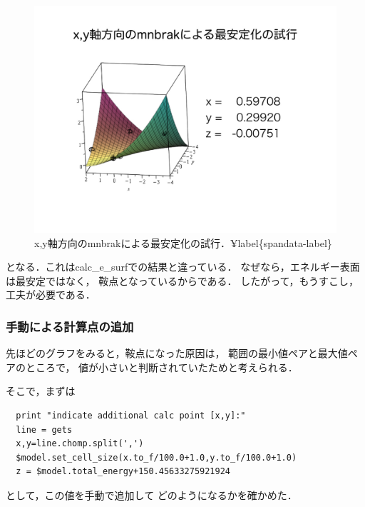 \documentclass[11pt,dvipdfmx]{jsarticle}
\begin{document}
\begin{figure}[H][htbp]
\centering
\begin{center}
\includegraphics[width=150mm]{../.././figs/thesis/thesis_008.jpeg}
\end{center}
\caption{x,y軸方向のmnbrakによる最安定化の試行．¥label\{spandata-label\}}

\label{fig:}
\end{figure}

となる．これはcalc\_e\_surfでの結果と違っている．
なぜなら，エネルギー表面は最安定ではなく， 鞍点となっているからである．
したがって，もうすこし，工夫が必要である．

    \subsubsection{手動による計算点の追加}\label{ux624bux52d5ux306bux3088ux308bux8a08ux7b97ux70b9ux306eux8ffdux52a0}

先ほどのグラフをみると，鞍点になった原因は，
範囲の最小値ペアと最大値ペアのところで，
値が小さいと判断されていたためと考えられる．

そこで，まずは

\begin{verbatim}
  print "indicate additional calc point [x,y]:"
  line = gets
  x,y=line.chomp.split(',')
  $model.set_cell_size(x.to_f/100.0+1.0,y.to_f/100.0+1.0)
  z = $model.total_energy+150.45633275921924
\end{verbatim}

として，この値を手動で追加して どのようになるかを確かめた．
\end{document}
